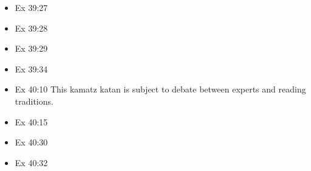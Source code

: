 \documentclass[14pt]{article}
\begin{document}
\begin{multicols}{2}
\begin{itemize}
\item Ex 39:27

\item Ex 39:28

\item Ex 39:29

\item Ex 39:34

\item Ex 40:10 This kamatz katan is subject to debate between experts and reading traditions.

\item Ex 40:15

\item Ex 40:30

\item Ex 40:32
\end{itemize}\end{multicols}
\end{document}
